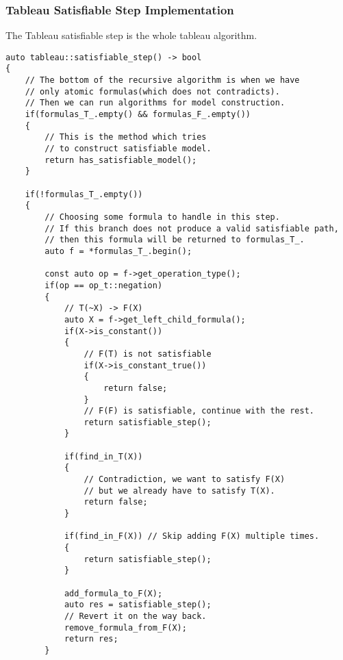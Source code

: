 \documentclass{article}
\begin{document}
	\subsubsection*{Tableau Satisfiable Step Implementation}
	The Tableau satisfiable step is the whole tableau algorithm.
\begin{lstlisting}
auto tableau::satisfiable_step() -> bool
{
    // The bottom of the recursive algorithm is when we have
    // only atomic formulas(which does not contradicts).
    // Then we can run algorithms for model construction.
    if(formulas_T_.empty() && formulas_F_.empty())
    {
        // This is the method which tries
        // to construct satisfiable model.
        return has_satisfiable_model();
    }

    if(!formulas_T_.empty())
    {
        // Choosing some formula to handle in this step.
        // If this branch does not produce a valid satisfiable path,
        // then this formula will be returned to formulas_T_.
        auto f = *formulas_T_.begin();

        const auto op = f->get_operation_type();
        if(op == op_t::negation)
        {
            // T(~X) -> F(X)
            auto X = f->get_left_child_formula();
            if(X->is_constant())
            {
                // F(T) is not satisfiable
                if(X->is_constant_true())
                {
                    return false;
                }
                // F(F) is satisfiable, continue with the rest.
                return satisfiable_step();
            }

            if(find_in_T(X))
            {
                // Contradiction, we want to satisfy F(X)
                // but we already have to satisfy T(X).
                return false;
            }

            if(find_in_F(X)) // Skip adding F(X) multiple times.
            {
                return satisfiable_step();
            }

            add_formula_to_F(X);
            auto res = satisfiable_step();
            // Revert it on the way back.
            remove_formula_from_F(X);
            return res;
        }
\end{lstlisting}
\newpage
\end{document}
